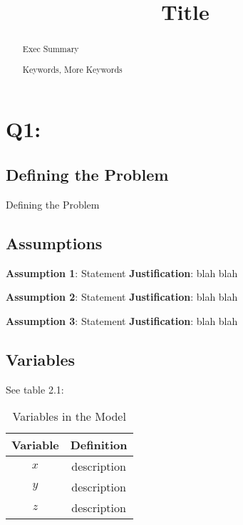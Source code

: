 \documentclass{mcm}
\title{Title}
\numberwithin{figure}{section}
\numberwithin{table}{section}
\numberwithin{equation}{section}
\begin{document}
    \begin{abstract}
        Exec Summary

        \begin{keywords}
            Keywords, More Keywords
        \end{keywords}

    \end{abstract}

    \maketitle
    \tableofcontents
    \newpage


    \section{Q1:}

    \subsection{Defining the Problem}
    Defining the Problem

    \subsection{Assumptions}
    \noindent\textbf{Assumption 1}: Statement
    \textbf{Justification}: blah blah

    \noindent\textbf{Assumption 2}: Statement
    \textbf{Justification}: blah blah

    \noindent\textbf{Assumption 3}: Statement
    \textbf{Justification}: blah blah

    \subsection{Variables}
    See table 2.1:
    \begin{table}[h!]
        \centering
        \begin{tabular}{cc}
            \toprule
            Variable & Definition      \\
            \midrule
            $x$      & description     \\
            $y$      & description     \\
            $z$      & description     \\
            \bottomrule
        \end{tabular}
        \caption{Variables in the Model}
        \label{tab:my_label}
    \end{table}
\end{document}

